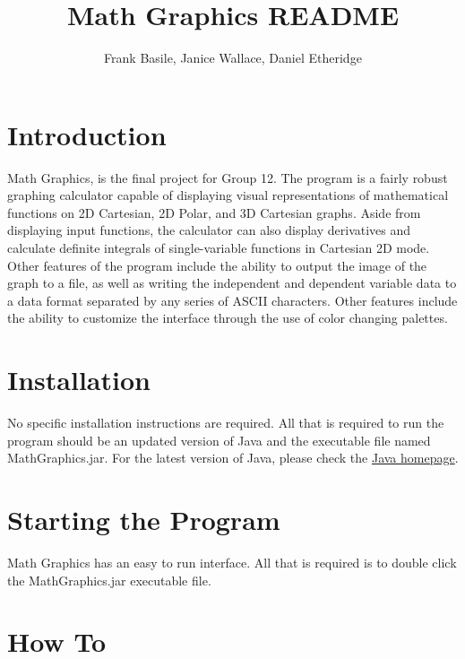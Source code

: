 \documentclass{article}[12 pt]
\begin{document}
\title{Math Graphics README}
\author{Frank Basile, Janice Wallace, Daniel Etheridge}
\maketitle

\tableofcontents
	\section{Introduction}
		Math Graphics, is the final project for Group 12. The program is a fairly robust graphing calculator capable of displaying visual representations of mathematical functions on 2D Cartesian, 2D Polar, and 3D Cartesian graphs. Aside from displaying input functions, the calculator can also display derivatives and calculate definite integrals of single-variable functions in Cartesian 2D mode. Other features of the program include the ability to output the image of the graph to a file, as well as writing the independent and dependent variable data to a data format separated by any series of ASCII characters. Other features include the ability to customize the interface through the use of color changing palettes.

	\section{Installation}
	    No specific installation instructions are required. All that is required to run the program should be an updated version of Java and the executable file named MathGraphics.jar. For the latest version of Java, please check the \href{http://www.java.com}{Java homepage}.
	    
	\section{Starting the Program}
		Math Graphics has an easy to run interface. All that is required is to double click the MathGraphics.jar executable file. 
		
	\section{How To}
\end{document}
